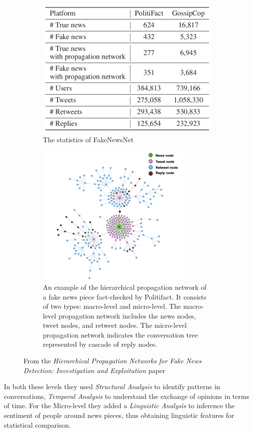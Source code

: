 \documentclass[10pt, english]{report}
\begin{document}
\begin{figure}[H]%
	\centering
	\begin{subfigure}{.5\textwidth}
		\includegraphics[width=.9\linewidth, height=7cm]{img/fake_news_net_content.png}
		\caption{The statistics of FakeNewsNet}
	\end{subfigure}%
	\begin{subfigure}{.5\textwidth}
		\includegraphics[width=.9\linewidth, height=7cm]{img/hierarchy_network.png}
		\caption{An example of the hierarchical propagation network of a fake news piece fact-checked by Politifact. It consists of two types: macro-level and micro-level. The macro-level propagation network includes the news nodes, tweet nodes, and retweet nodes. The micro-level propagation network indicates the conversation tree represented by cascade of reply nodes.}
	\end{subfigure}
	\caption{From the \textit{Hierarchical Propagation Networks for Fake News Detection: Investigation and Exploitation} paper}%
\end{figure}



In both these levels they used \textit{Structural Analysis} to identify patterns in conversations, \textit{Temporal Analysis} to understand the exchange of opinions in terms of time. For the Micro-level they added a \textit{Linguistic Analysis} to inference the sentiment of people around news pieces, thus obtaining linguistic features for statistical comparison.\\
\end{document}
